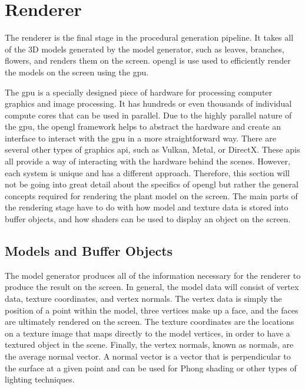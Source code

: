 \section{Renderer}

\noindent
The renderer is the final stage in the procedural generation pipeline. It takes all of the 3D models generated by the model generator, such as leaves, branches, flowers, and renders them on the screen. \acrshort{opengl} is use used to efficiently render the models on the screen using the \acrshort{gpu}. 

The \acrshort{gpu} is a specially designed piece of hardware for processing computer graphics and image processing. It has hundreds or even thousands of individual compute cores that can be used in parallel. Due to the highly parallel nature of the \acrshort{gpu}, the \acrshort{opengl} framework helps to abstract the hardware and create an interface to interact with the \acrshort{gpu} in a more straightforward way. There are several other types of graphics \acrshort{api}, such as Vulkan, Metal, or DirectX. These \acrshort{api}s all provide a way of interacting with the hardware behind the scenes. However, each system is unique and has a different approach. Therefore, this section will not be going into great detail about the specifics of \acrshort{opengl} but rather the general concepts required for rendering the plant model on the screen. The main parts of the rendering stage have to do with how model and texture data is stored into buffer objects, and how shaders can be used to display an object on the screen.

\subsection{Models and Buffer Objects}

The model generator produces all of the information necessary for the renderer to produce the result on the screen. In general, the model data will consist of vertex data, texture coordinates, and vertex normals. The vertex data is simply the position of a point within the model, three vertices make up a face, and the faces are ultimately rendered on the screen. The texture coordinates are the locations on a texture image that maps directly to the model vertices, in order to have a textured object in the scene. Finally, the vertex normals, known as normals, are the average normal vector. A normal vector is a vector that is perpendicular to the surface at a given point and can be used for Phong shading or other types of lighting techniques.  

